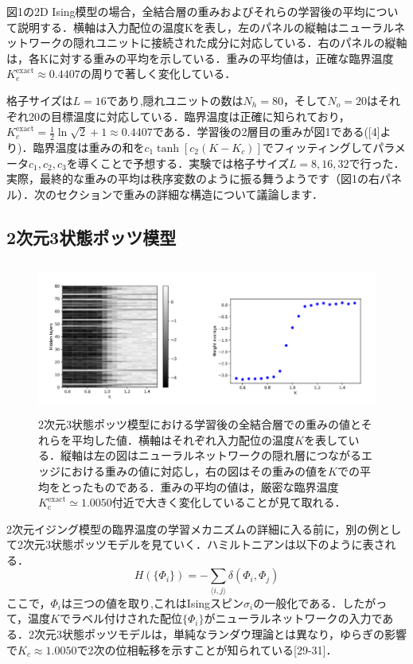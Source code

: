 \documentclass[a4paper,11pt]{jsarticle}
\begin{document}
図1の2D Ising模型の場合，全結合層の重みおよびそれらの学習後の平均について説明する．横軸は入力配位の温度Kを表し，左のパネルの縦軸はニューラルネットワークの隠れユニットに接続された成分に対応している．右のパネルの縦軸は，各Kに対する重みの平均を示している．重みの平均値は，正確な臨界温度$K_e^{\text{exact}} \approx 0.4407$の周りで著しく変化している．


格子サイズは$L = 16$であり,隠れユニットの数は$N_h = 80$，そして$N_o = 20$はそれぞれ20の目標温度に対応している．臨界温度は正確に知られており，$K_c^{\text{exact}} = \frac{1}{2}\ln{\sqrt{2}+1} \approx 0.4407$である．学習後の2層目の重みが図1である([4]より)．臨界温度は重みの和を$c_1 \tanh{[c_2(K-K_c)]}$でフィッティングしてパラメータ$c_1,c_2,c_3$を導くことで予想する．実験では格子サイズ$L=8,16,32$で行った．実際，最終的な重みの平均は秩序変数のように振る舞うようです（図1の右パネル）．次のセクションで重みの詳細な構造について議論します．


\subsection{2次元3状態ポッツ模型}
\begin{figure}[hb]
  \begin{center}
    \includegraphics[height=5cm]{image/Figure2.png}
    \caption{2次元3状態ポッツ模型における学習後の全結合層での重みの値とそれらを平均した値．横軸はそれぞれ入力配位の温度$K$を表している．縦軸は左の図はニューラルネットワークの隠れ層につながるエッジにおける重みの値に対応し，右の図はその重みの値を$K$での平均をとったものである．重みの平均の値は，厳密な臨界温度$K_{\text{c}}^{\text{exact}}\simeq 1.0050$付近で大きく変化していることが見て取れる．}
  \end{center}
\end{figure}
2次元イジング模型の臨界温度の学習メカニズムの詳細に入る前に，別の例として2次元3状態ポッツモデルを見ていく．ハミルトニアンは以下のように表される．
\begin{equation}
  H(\{\Phi_i\}) = - \sum_{\langle i,j \rangle} \delta(\Phi_i, \Phi_j)
\end{equation}
ここで，$\Phi_i$は三つの値を取り,これはIsingスピン$\sigma_i$の一般化である．したがって，温度$K$でラベル付けされた配位$\{ \Phi_i \}$がニューラルネットワークの入力である．2次元3状態ポッツモデルは，単純なランダウ理論とは異なり，ゆらぎの影響で$K_c \approx 1.0050$で2次の位相転移を示すことが知られている[29-31]．
\end{document}
